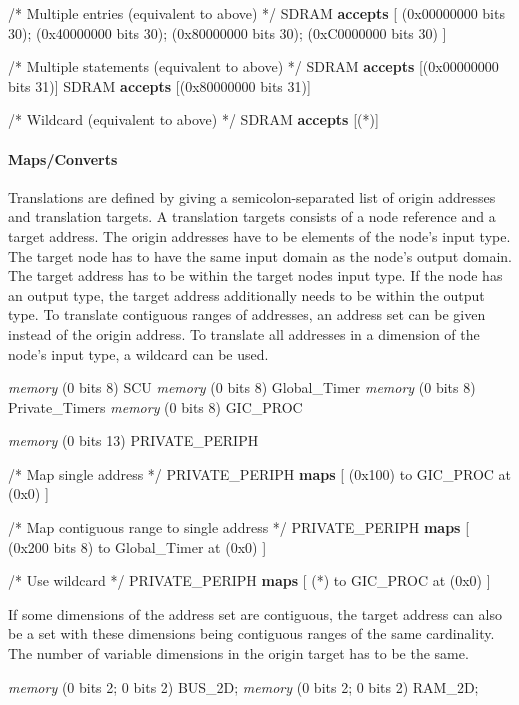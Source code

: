\documentclass[a4paper,11pt,twoside]{report}
\begin{document}
{{{\begin{example}
 /* Multiple entries (equivalent to above) */
  SDRAM \textbf{accepts} [
    (0x00000000 bits 30);
    (0x40000000 bits 30);
    (0x80000000 bits 30);
    (0xC0000000 bits 30)
  ]

/* Multiple statements (equivalent to above) */
SDRAM \textbf{accepts} [(0x00000000 bits 31)]
SDRAM \textbf{accepts} [(0x80000000 bits 31)]

/* Wildcard (equivalent to above) */
SDRAM \textbf{accepts} [(*)]
\end{example}

\paragraph{Maps/Converts}
Translations are defined by giving a semicolon-separated list of origin addresses and translation targets.
A translation targets consists of a node reference and a target address.
The origin addresses have to be elements of the node's input type.
The target node has to have the same input domain as the node's output domain.
The target address has to be within the target nodes input type.
If the node has an output type, the target address additionally needs to be within the output type.
To translate contiguous ranges of addresses, an address set can be given instead of the origin address.
To translate all addresses in a dimension of the node's input type, a wildcard can be used.
\begin{example}
\textit{memory} (0 bits 8) SCU
\textit{memory} (0 bits 8) Global_Timer 
\textit{memory} (0 bits 8) Private_Timers
\textit{memory} (0 bits 8) GIC_PROC

\textit{memory} (0 bits 13) PRIVATE_PERIPH

/* Map single address */
  PRIVATE_PERIPH \textbf{maps} [
    (0x100) to GIC_PROC at (0x0)
  ]

/* Map contiguous range to single address */
  PRIVATE_PERIPH \textbf{maps} [
    (0x200 bits 8) to Global_Timer at (0x0)
  ]

/* Use wildcard */
  PRIVATE_PERIPH \textbf{maps} [
    (*) to GIC_PROC at (0x0)
  ]
\end{example}

If some dimensions of the address set are contiguous, the target address can also be a set with these dimensions being contiguous ranges of the same cardinality.
The number of variable dimensions in the origin target has to be the same.
\begin{example}
  \textit{memory} (0 bits 2; 0 bits 2) BUS_2D;
  \textit{memory} (0 bits 2; 0 bits 2) RAM_2D;


\end{example}}}}
\end{document}
